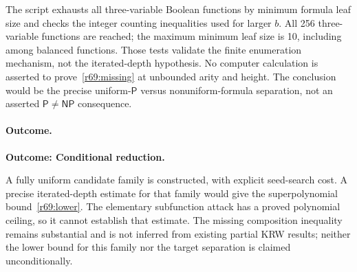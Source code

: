 \documentclass[11pt,a4paper]{article}
\numberwithin{equation}{section}
\begin{document}
The script exhausts all three-variable Boolean functions by minimum formula leaf size and checks the integer counting inequalities used for larger $b$. All 256 three-variable functions are reached; the maximum minimum leaf size is 10, including among balanced functions. Those tests validate the finite enumeration mechanism, not the iterated-depth hypothesis. No computer calculation is asserted to prove~\eqref{r69:missing} at unbounded arity and height. The conclusion would be the precise uniform-$\mathsf P$ versus nonuniform-formula separation, not an asserted $\mathsf P\ne\mathsf{NP}$ consequence.

\paragraph{Outcome.}
\textbf{Outcome: Conditional reduction.}

A fully uniform candidate family is constructed, with explicit seed-search cost. A precise iterated-depth estimate for that family would give the superpolynomial bound~\eqref{r69:lower}. The elementary subfunction attack has a proved polynomial ceiling, so it cannot establish that estimate. The missing composition inequality remains substantial and is not inferred from existing partial KRW results; neither the lower bound for this family nor the target separation is claimed unconditionally.

\end{document}

